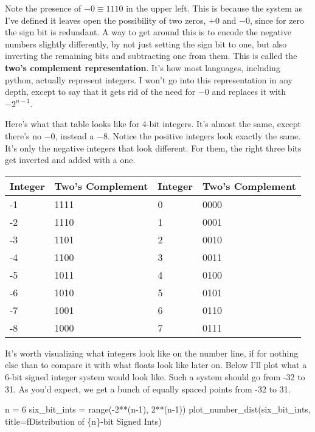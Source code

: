 \documentclass[
  letterpaper,
  DIV=11,
  numbers=noendperiod]{scrreprt}
\newenvironment{Shaded}{\begin{snugshade}}{\end{snugshade}}
\newcommand{\BuiltInTok}[1]{\textcolor[rgb]{0.00,0.23,0.31}{#1}}
\newcommand{\DecValTok}[1]{\textcolor[rgb]{0.68,0.00,0.00}{#1}}
\newcommand{\NormalTok}[1]{\textcolor[rgb]{0.00,0.23,0.31}{#1}}
\newcommand{\OperatorTok}[1]{\textcolor[rgb]{0.37,0.37,0.37}{#1}}
\newcommand{\SpecialCharTok}[1]{\textcolor[rgb]{0.37,0.37,0.37}{#1}}
\newcommand{\SpecialStringTok}[1]{\textcolor[rgb]{0.13,0.47,0.30}{#1}}
\begin{document}
Note the presence of \(-0 \equiv 1110\) in the upper left. This is
because the system as I've defined it leaves open the possibility of two
zeros, \(+0\) and \(-0\), since for zero the sign bit is redundant. A
way to get around this is to encode the negative numbers slightly
differently, by not just setting the sign bit to one, but also inverting
the remaining bits and subtracting one from them. This is called the
\textbf{two's complement representation}. It's how most languages,
including python, actually represent integers. I won't go into this
representation in any depth, except to say that it gets rid of the need
for \(-0\) and replaces it with \(-2^{n-1}\).

Here's what that table looks like for 4-bit integers. It's almost the
same, except there's no \(-0\), instead a \(-8\). Notice the positive
integers look exactly the same. It's only the negative integers that
look different. For them, the right three bits get inverted and added
with a one.

\begin{longtable}[]{@{}llll@{}}
\toprule()
Integer & Two's Complement & Integer & Two's Complement \\
\midrule()
\endhead
-1 & 1111 & 0 & 0000 \\
-2 & 1110 & 1 & 0001 \\
-3 & 1101 & 2 & 0010 \\
-4 & 1100 & 3 & 0011 \\
-5 & 1011 & 4 & 0100 \\
-6 & 1010 & 5 & 0101 \\
-7 & 1001 & 6 & 0110 \\
-8 & 1000 & 7 & 0111 \\
\bottomrule()
\end{longtable}

It's worth visualizing what integers look like on the number line, if
for nothing else than to compare it with what floats look like later on.
Below I'll plot what a 6-bit signed integer system would look like. Such
a system should go from -32 to 31. As you'd expect, we get a bunch of
equally spaced points from -32 to 31.

\begin{Shaded}
\begin{Highlighting}[]
\NormalTok{n }\OperatorTok{=} \DecValTok{6}
\NormalTok{six\_bit\_ints }\OperatorTok{=} \BuiltInTok{range}\NormalTok{(}\OperatorTok{{-}}\DecValTok{2}\OperatorTok{**}\NormalTok{(n}\OperatorTok{{-}}\DecValTok{1}\NormalTok{), }\DecValTok{2}\OperatorTok{**}\NormalTok{(n}\OperatorTok{{-}}\DecValTok{1}\NormalTok{))}
\NormalTok{plot\_number\_dist(six\_bit\_ints, title}\OperatorTok{=}\SpecialStringTok{f\textquotesingle{}Distribution of }\SpecialCharTok{\{}\NormalTok{n}\SpecialCharTok{\}}\SpecialStringTok{{-}bit Signed Ints\textquotesingle{}}\NormalTok{)}
\end{Highlighting}
\end{Shaded}
\end{document}
